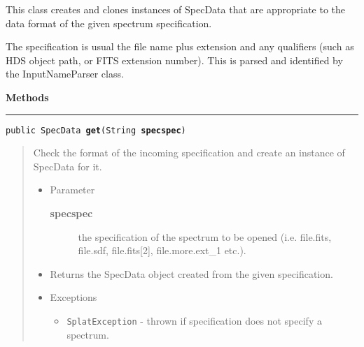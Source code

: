 \documentclass[twoside,11pt,nolof]{starlink}
\providecommand{\method}[1]{\texttt{#1}}
\newenvironment{desc}{\begin{quote}}{\end{quote}}
\providecommand{\methods}{
   \par\textbf{\large{Methods}}\\
   \hrule
}
\begin{document}


{This class creates and clones instances of SpecData that are
 appropriate to the data format of the given spectrum specification.

 The specification is usual the file name plus extension and any
 qualifiers (such as HDS object path, or FITS extension
 number). This is parsed and identified by the InputNameParser
 class.}
\methods
\method{public SpecData \textbf{get}(\texttt{String} \textbf{specspec})\label{l123}\label{l124}}
\begin{desc}Check the format of the incoming specification and create an
  instance of SpecData for it.
\begin{itemize}
\item{Parameter
  \begin{description}
   \item[\textbf{specspec}]{the specification of the spectrum to be
                  opened (i.e. file.fits, file.sdf,
                  file.fits[2], file.more.ext\_1 etc.).}
  \end{description}}
\end{itemize}
\begin{itemize}
\item{Returns the SpecData object created from the given
          specification. }
\item{{Exceptions}
  \begin{itemize}
   \item{\vspace{-.6ex}\texttt{SplatException} - thrown if specification does not
             specify a spectrum.}
  \end{itemize}
}
\end{itemize}
\end{desc}
\end{document}
